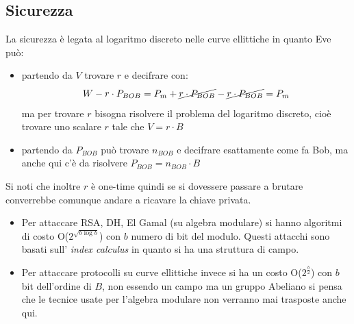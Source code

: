 \subsection{Sicurezza}
La sicurezza è legata al logaritmo discreto nelle curve ellittiche in quanto Eve può:
\begin{itemize}
    \item partendo da $V$ trovare $r$ e decifrare con:
    $$W - r\cdot P_{BOB} = P_m + \cancel{r \cdot P_{BOB}} - \cancel{r \cdot P_{BOB}} = P_m$$
    ma per trovare $r$ bisogna risolvere il problema del logaritmo discreto, cioè trovare uno scalare $r$ tale che $V = r \cdot B$
    
    \item partendo da $P_{BOB}$ può trovare $n_{BOB}$ e decifrare esattamente come fa Bob, ma anche qui c'è da risolvere $P_{BOB} = n_{BOB} \cdot B$
\end{itemize}
Si noti che inoltre $r$ è one-time quindi se si dovessere passare a brutare converrebbe comunque andare a ricavare la chiave privata.
\begin{itemize}
	\item Per attaccare RSA, DH, El Gamal (su algebra modulare) si hanno algoritmi di costo O($2^{\sqrt{b \log b}}$) con $b$ numero di bit del modulo. Questi attacchi sono basati sull' \emph{index calculus} in quanto si ha una struttura di campo.
	\item	Per attaccare protocolli su curve ellittiche invece si ha un costo O($2^{\frac{b}{2}}$) con $b$ bit dell'ordine di $B$, non essendo un campo ma un gruppo Abeliano si pensa che le tecnice usate per l'algebra modulare non verranno mai trasposte anche qui.
\end{itemize}